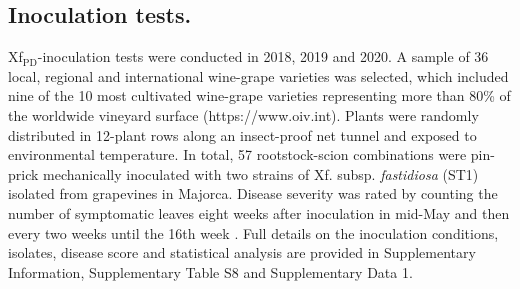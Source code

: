     \subsection{Inoculation tests.} Xf$_{\textrm{PD}}$-inoculation tests were
    conducted in 2018, 2019 and 2020. A sample of 36 local, regional and
    international wine-grape varieties was selected, which included nine of the
    10
    most cultivated wine-grape varieties representing more than 80\% of the
    worldwide vineyard surface (https://www.oiv.int). Plants were randomly
    distributed in 12-plant rows along an insect-proof net tunnel and exposed
    to
    environmental temperature. In total, 57 rootstock-scion combinations were
    pin-prick mechanically inoculated \cite{Almeida2003} with two strains of
    Xf.
    subsp. \textit{fastidiosa} (ST1) isolated from grapevines in Majorca.
    Disease
    severity was rated by counting the number of symptomatic leaves eight weeks
    after inoculation in mid-May and then every two weeks until the 16th week
    \cite{Moralejo2019}. Full details on the inoculation conditions, isolates,
    disease score and statistical analysis are provided in Supplementary
    Information, Supplementary Table S8 and Supplementary Data 1.

